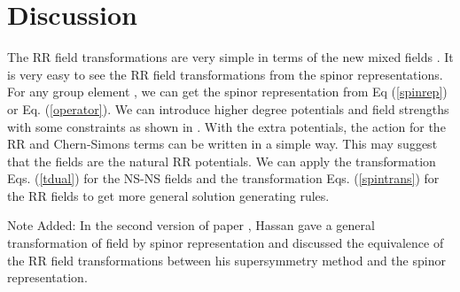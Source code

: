 \documentclass[a4paper,12pt]{article}
\begin{document}
\section{Discussion}

The RR field transformations are very simple in terms
of the new mixed fields \coordHE{}. It is very easy to
see the RR field transformations from the spinor
representations. 
For any group element \coordHE{}, we can
get the spinor representation \coordHE{} from
Eq (\ref{spinrep}) or Eq. (\ref{operator}).
We can introduce higher degree
potentials and field strengths with some constraints
as shown in \cite{fukuma99}. With the extra potentials,
the action for the RR and Chern-Simons terms
can be written in a simple way. This may suggest
that the \coordHE{} fields are the natural RR potentials.
We can apply the transformation Eqs. (\ref{tdual}) for the
NS-NS fields and the transformation Eqs. (\ref{spintrans})
for the RR fields to get more general solution generating
rules.  

\bigskip

{\noindent Note Added:} In the second version of paper
\cite{hassan99}, Hassan gave a general transformation
of \coordHE{} field by spinor representation and discussed
the equivalence of the RR field transformations between
his supersymmetry method and the spinor representation.
\end{document}
